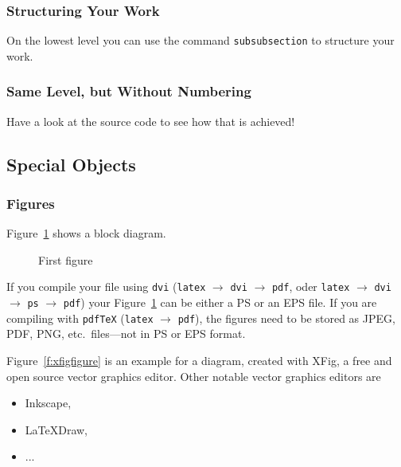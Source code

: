 \subsubsection{Structuring Your Work}

On the lowest level you can use the command \texttt{subsubsection} to structure your work.

\subsubsection*{Same Level, but Without Numbering}

Have a look at the source code to see how that is achieved!

\subsection{Special Objects}


\subsubsection{Figures}\label{b:picturesubsection}

Figure~\ref{f:picfirstfigure} shows a block diagram.

\begin{figure}[ht]		%
  \centering
  \caption{First figure}
  \label{f:picfirstfigure}
\end{figure}

If you compile your file using \texttt{dvi} 
(\texttt{latex} $\rightarrow$ \texttt{dvi} $\rightarrow$ \texttt{pdf}, oder \texttt{latex} $\rightarrow$ \texttt{dvi} $\rightarrow$ \texttt{ps} $\rightarrow$ \texttt{pdf}) 
your Figure~\ref{f:picfirstfigure} can be either a PS or an EPS file. If you are compiling with \texttt{pdfTeX}
(\texttt{latex} $\rightarrow$ \texttt{pdf}), the figures need to be stored as JPEG, PDF, PNG, etc.\ files---not in PS or EPS format.

Figure~\ref{f:xfigfigure} is an example for a diagram, created with XFig, a free and open source vector graphics editor.
Other notable vector graphics editors are
\begin{itemize}
	\item Inkscape,
	\item \LaTeX Draw,
	\item ...
\end{itemize}

